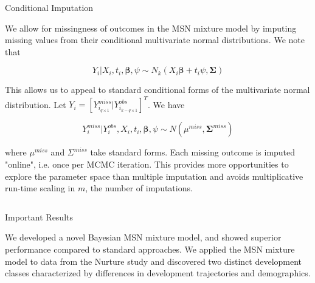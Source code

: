 \documentclass[final]{beamer}
\newlength{\onecolwid}
\newlength{\twocolwid}
\begin{document}
\begin{frame}[t]
\begin{columns}[t]
\begin{column}{\twocolwid}
\begin{columns}[t,totalwidth=\twocolwid]
\begin{column}{\onecolwid}

\begin{block}{Conditional Imputation}

We allow for missingness of outcomes in the MSN mixture model by imputing missing values from their conditional multivariate normal distributions. We note that

$$Y_i|X_i,t_i,\boldsymbol\beta,\psi \sim N_k(X_i \boldsymbol\beta + t_i \psi, \boldsymbol\Sigma)$$

This allows us to appeal to standard conditional forms of the multivariate normal distribution. Let $Y_i = [Y^{miss}_{i_{q \times 1}} | Y^{obs}_{i_{k - q \times 1}}]^T$. We have

$$Y_i^{miss}|Y_i^{obs},X_i,t_i,\boldsymbol\beta,\psi \sim N(\mu^{miss},\boldsymbol\Sigma^{miss})$$

where $\mu^{miss}$ and $\Sigma^{miss}$ take standard forms. Each missing outcome is imputed "online", i.e. once per MCMC iteration. This provides more opportunities to explore the parameter space than multiple imputation and avoids multiplicative run-time scaling in $m$, the number of imputations.

\end{block}


\end{column} %

\end{columns} %


\begin{alertblock}{Important Results}

We developed a novel Bayesian MSN mixture model, and showed superior performance compared to standard approaches. We applied the MSN mixture model to data from the Nurture study and discovered two distinct development classes characterized by differences in development trajectories and demographics.


\end{alertblock}
\end{column}
\end{columns}
\end{frame}
\end{document}
